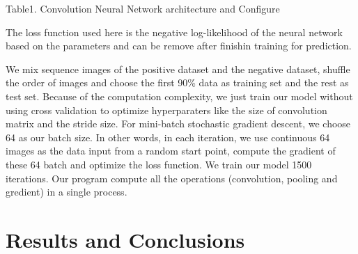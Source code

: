 \documentclass[letterpaper, 11pt]{article}
\begin{document}
\begin{multicols*}{2}
{\begin{center}
\footnotesize{Table1. Convolution Neural Network architecture and Configure}
\end{center}

The loss function used here is the negative log-likelihood of the neural network based on the parameters and can be remove after finishin training for prediction.

We mix sequence images of the positive dataset and the negative dataset, shuffle the order of images and choose the first 90\% data as training set and the rest as test set. Because of the computation complexity, we just train our model without using cross validation to optimize hyperparaters like the size of convolution matrix and the stride size. For mini-batch stochastic gradient descent, we choose 64 as our batch size. In other words, in each iteration, we use continuous 64 images as the data input from a random start point, compute the gradient of these 64 batch and optimize the loss function. We train our model 1500 iterations. Our program compute all the operations (convolution, pooling and gredient) in a single process.
}

\section{Results and Conclusions}

{
}
\end{multicols*}
\end{document}
